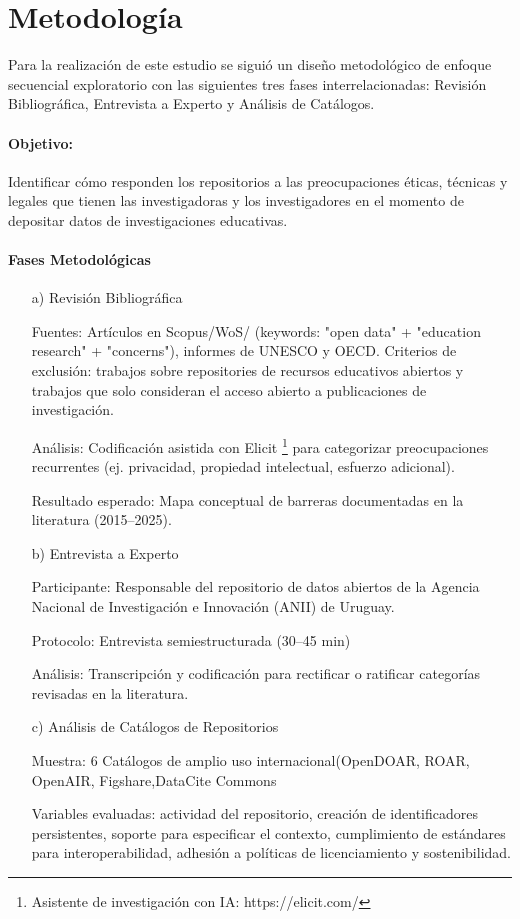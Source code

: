 \documentclass[runningheads]{llncs}
\begin{document}
\section{Metodología}
\label{Metodo}
Para la realización de este estudio se siguió un diseño metodológico de enfoque secuencial exploratorio con las siguientes tres fases interrelacionadas: Revisión Bibliográfica, Entrevista a Experto y Análisis de Catálogos.

\paragraph{Objetivo:} Identificar cómo responden los repositorios a las preocupaciones  éticas, técnicas y legales que tienen las investigadoras y los investigadores en el momento de depositar datos de investigaciones educativas.

\paragraph{Fases Metodológicas}
\begin{itemize}
    \item [a)] Revisión Bibliográfica
    
Fuentes: Artículos en Scopus/WoS/ (keywords: "open data" + "education research" + "concerns"), informes de UNESCO y OECD. Criterios de exclusión: trabajos sobre repositories de recursos educativos abiertos y trabajos que solo consideran el acceso abierto a publicaciones de investigación.

Análisis: Codificación asistida con Elicit \footnote{Asistente de investigación con IA: https://elicit.com/} para categorizar preocupaciones recurrentes (ej. privacidad, propiedad intelectual, esfuerzo adicional).

Resultado esperado: Mapa conceptual de barreras documentadas en la literatura (2015–2025).

\item [b)]  Entrevista a Experto

Participante: Responsable del repositorio de datos abiertos de la Agencia Nacional de Investigación e Innovación (ANII) de Uruguay.

Protocolo: Entrevista semiestructurada (30–45 min) 

Análisis: Transcripción y codificación para rectificar o ratificar categorías revisadas en la literatura.

\item [c)] Análisis de Catálogos de Repositorios

    Muestra:  6 Catálogos de amplio uso internacional(OpenDOAR, ROAR, OpenAIR, Figshare,DataCite Commons
    
    Variables evaluadas: actividad del repositorio, creación de identificadores persistentes, soporte para especificar el contexto, cumplimiento de estándares para interoperabilidad,  adhesión a políticas de licenciamiento y sostenibilidad.

\end{itemize}
\end{document}
